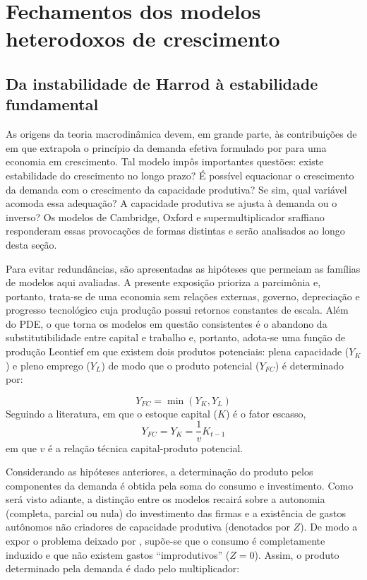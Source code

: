 \section{Fechamentos dos modelos heterodoxos de crescimento}
\subsection{Da instabilidade de Harrod à estabilidade fundamental}
\label{SecHarrod}

As origens da teoria macrodinâmica devem, em grande parte, às contribuições de \textcite{harrod_essay_1939} em que extrapola o princípio da demanda efetiva formulado por \textcite{keynes_general_1936} para uma economia em crescimento. Tal modelo impôs importantes questões: existe estabilidade do crescimento no longo pra\-zo? É possível equacionar o crescimento da demanda com o crescimento da capacidade produtiva? Se sim, qual variável acomoda essa adequação? A capacidade produtiva se ajusta à demanda ou o inverso? Os modelos de Cambridge, Oxford e supermultiplicador sraffiano responderam essas provocações de formas distintas e serão analisados ao longo desta seção.

Para evitar redundâncias, são apresentadas as hipóteses que permeiam as famílias de modelos aqui avaliadas. 
A presente exposição prioriza a parcimônia e, portanto, trata-se de uma economia sem relações externas, governo, depreciação e progresso tecnológico cuja produção possui retornos constantes de escala. Além do PDE, o que torna os modelos em questão consistentes é o abandono da substitutibilidade entre capital e trabalho e, portanto, adota-se uma função de produção Leontief em que existem dois produtos potenciais: plena capacidade ($Y_K$) e pleno emprego ($Y_L$) de modo que o produto potencial ($Y_{FC}$) é determinado por:

\begin{equation}
    Y_{FC} = \min (Y_K, Y_L)
\end{equation}
Seguindo a literatura, em que o estoque capital ($K$) é o fator escasso,
\begin{equation}
\label{Oferta}
    Y_{FC} = Y_K = \frac{1}{v}K_{t-1}
\end{equation}
em que $v$ é a relação técnica capital-produto potencial. 


Considerando as hipóteses anteriores, a determinação do produto pelos componentes da demanda é obtida pela soma do consumo e investimento. Como será visto adiante, a distinção entre os modelos recairá sobre a autonomia (completa, parcial ou nula) do investimento das firmas e a existência de gastos autônomos não criadores de capacidade produtiva (denotados por $Z$). De modo a expor o problema deixado por \textcite{harrod_essay_1939}, supõe-se que o consumo é completamente induzido e que não existem gastos ``improdutivos'' ($Z=0$). Assim, o produto determinado pela demanda é dado pelo multiplicador:


